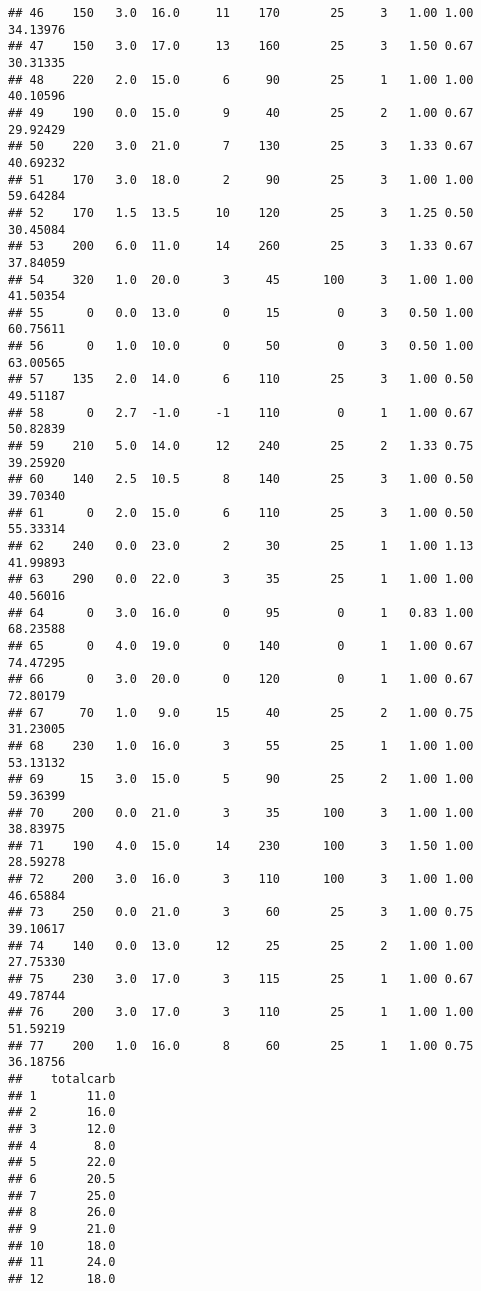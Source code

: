 \documentclass[
]{article}
\begin{document}
\begin{verbatim}
## 46    150   3.0  16.0     11    170       25     3   1.00 1.00 34.13976
## 47    150   3.0  17.0     13    160       25     3   1.50 0.67 30.31335
## 48    220   2.0  15.0      6     90       25     1   1.00 1.00 40.10596
## 49    190   0.0  15.0      9     40       25     2   1.00 0.67 29.92429
## 50    220   3.0  21.0      7    130       25     3   1.33 0.67 40.69232
## 51    170   3.0  18.0      2     90       25     3   1.00 1.00 59.64284
## 52    170   1.5  13.5     10    120       25     3   1.25 0.50 30.45084
## 53    200   6.0  11.0     14    260       25     3   1.33 0.67 37.84059
## 54    320   1.0  20.0      3     45      100     3   1.00 1.00 41.50354
## 55      0   0.0  13.0      0     15        0     3   0.50 1.00 60.75611
## 56      0   1.0  10.0      0     50        0     3   0.50 1.00 63.00565
## 57    135   2.0  14.0      6    110       25     3   1.00 0.50 49.51187
## 58      0   2.7  -1.0     -1    110        0     1   1.00 0.67 50.82839
## 59    210   5.0  14.0     12    240       25     2   1.33 0.75 39.25920
## 60    140   2.5  10.5      8    140       25     3   1.00 0.50 39.70340
## 61      0   2.0  15.0      6    110       25     3   1.00 0.50 55.33314
## 62    240   0.0  23.0      2     30       25     1   1.00 1.13 41.99893
## 63    290   0.0  22.0      3     35       25     1   1.00 1.00 40.56016
## 64      0   3.0  16.0      0     95        0     1   0.83 1.00 68.23588
## 65      0   4.0  19.0      0    140        0     1   1.00 0.67 74.47295
## 66      0   3.0  20.0      0    120        0     1   1.00 0.67 72.80179
## 67     70   1.0   9.0     15     40       25     2   1.00 0.75 31.23005
## 68    230   1.0  16.0      3     55       25     1   1.00 1.00 53.13132
## 69     15   3.0  15.0      5     90       25     2   1.00 1.00 59.36399
## 70    200   0.0  21.0      3     35      100     3   1.00 1.00 38.83975
## 71    190   4.0  15.0     14    230      100     3   1.50 1.00 28.59278
## 72    200   3.0  16.0      3    110      100     3   1.00 1.00 46.65884
## 73    250   0.0  21.0      3     60       25     3   1.00 0.75 39.10617
## 74    140   0.0  13.0     12     25       25     2   1.00 1.00 27.75330
## 75    230   3.0  17.0      3    115       25     1   1.00 0.67 49.78744
## 76    200   3.0  17.0      3    110       25     1   1.00 1.00 51.59219
## 77    200   1.0  16.0      8     60       25     1   1.00 0.75 36.18756
##    totalcarb
## 1       11.0
## 2       16.0
## 3       12.0
## 4        8.0
## 5       22.0
## 6       20.5
## 7       25.0
## 8       26.0
## 9       21.0
## 10      18.0
## 11      24.0
## 12      18.0

\end{verbatim}
\end{document}
